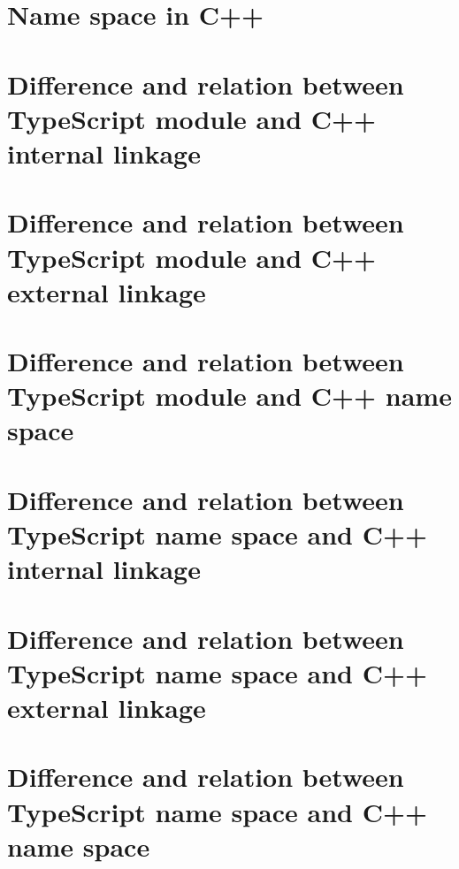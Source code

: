\documentclass[a4paper]{report}
\begin{document}
\section{Name space in C++}

\section{Difference and relation between TypeScript module and C++ internal linkage}

\section{Difference and relation between TypeScript module and C++ external linkage}

\section{Difference and relation between TypeScript module and C++ name space}

\section{Difference and relation between TypeScript name space and C++ internal linkage}

\section{Difference and relation between TypeScript name space and C++ external linkage}

\section{Difference and relation between TypeScript name space and C++ name space}
\end{document}

